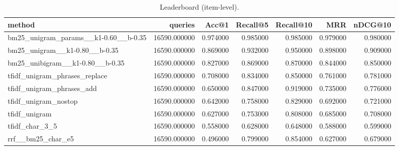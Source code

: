 \begin{table}
\caption{Leaderboard (item-level).}
\label{tab:lb_item}
\begin{tabular}{lrrrrrr}
\toprule
method & queries & Acc@1 & Recall@5 & Recall@10 & MRR & nDCG@10 \\
\midrule
bm25_unigram_params__k1-0.60__b-0.35 & 16590.000000 & 0.974000 & 0.985000 & 0.985000 & 0.979000 & 0.980000 \\
bm25_unigram__k1-0.80__b-0.35 & 16590.000000 & 0.869000 & 0.932000 & 0.950000 & 0.898000 & 0.909000 \\
bm25_unibigram__k1-0.80__b-0.35 & 16590.000000 & 0.827000 & 0.869000 & 0.870000 & 0.844000 & 0.850000 \\
tfidf_unigram_phrases_replace & 16590.000000 & 0.708000 & 0.834000 & 0.850000 & 0.761000 & 0.781000 \\
tfidf_unigram_phrases_add & 16590.000000 & 0.650000 & 0.847000 & 0.919000 & 0.735000 & 0.776000 \\
tfidf_unigram_nostop & 16590.000000 & 0.642000 & 0.758000 & 0.829000 & 0.692000 & 0.721000 \\
tfidf_unigram & 16590.000000 & 0.627000 & 0.753000 & 0.808000 & 0.685000 & 0.708000 \\
tfidf_char_3_5 & 16590.000000 & 0.558000 & 0.628000 & 0.648000 & 0.588000 & 0.599000 \\
rrf__bm25_char_e5 & 16590.000000 & 0.496000 & 0.799000 & 0.854000 & 0.627000 & 0.679000 \\
\bottomrule
\end{tabular}
\end{table}
